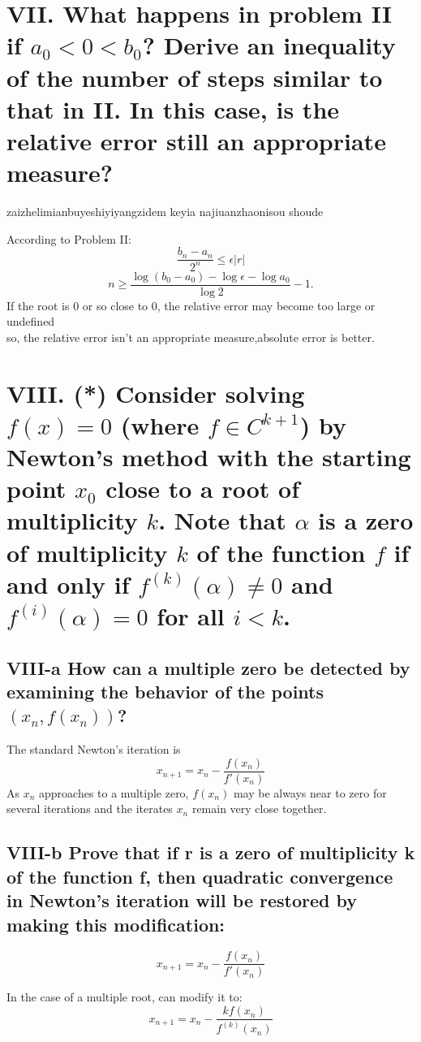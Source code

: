 \documentclass[a4paper]{article}
\begin{document}
\section*{VII. What happens in problem II if \( a_0 < 0 < b_0 \)? Derive an inequality of the number of steps similar to that in II. In this case, is the relative error still an appropriate measure? }

zaizhelimianbuyeshiyiyangzidem
keyia najiuanzhaonisou shoude 

According to Problem II: \[\frac{b_n - a_n}{2^n} \leq \epsilon|r|\]
\[n \geq \frac{\log(b_0 - a_0) - \log \epsilon - \log a_0}{\log 2} - 1.\]
If the root is \(0\) or so close to \(0\), the relative error may become too large or undefined\\
so, the relative error isn’t an appropriate measure,absolute error is better.

\section*{VIII. (*) Consider solving \( f(x) = 0 \) (where \( f \in C^{k+1} \)) by Newton's method with the starting point \( x_0 \) close to a root of multiplicity \( k \). Note that \( \alpha \) is a zero of multiplicity \( k \) of the function \( f \) if and only if \( f^{(k)}(\alpha) \neq 0 \) and \( f^{(i)}(\alpha) = 0 \) for all \( i < k \).}

\subsection*{VIII-a How can a multiple zero be detected by examining the behavior of the points $(x_n, f(x_n))$?}

The standard Newton's iteration is \[x_{n+1} = x_n - \frac{f(x_n)}{f'(x_n)}\]
As \(x_n\) approaches to a multiple zero, \(f(x_n)\) may be always near to zero for several iterations and the iterates \(x_n\) remain very close together.

\subsection*{VIII-b Prove that if r is a zero of multiplicity k of the function f, then quadratic convergence in Newton’s iteration will be restored by making this modification:}
\[x_{n+1} = x_n - \frac{f(x_n)}{f'(x_n)}\]

In the case of a multiple root, can modify it to:
\[x_{n+1} = x_n - \frac{k f(x_n)}{f^{(k)}(x_n)}\]
\end{document}

